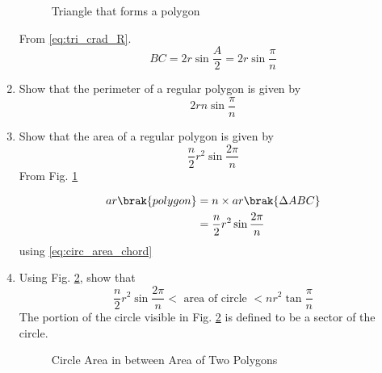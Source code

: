 \begin{enumerate}[label=\arabic*.,ref=\thesubsection.\theenumi]
\begin{figure}[!ht]
\begin{center}
		\resizebox{\columnwidth}{!}{}
	\end{center}
	\caption{Triangle that forms a polygon}
	\label{ch5_polygon_area}	
\end{figure}
%
\solution From  \eqref{eq:tri_crad_R}.
%
\begin{equation}
BC = 2r \sin \frac{A}{2} = 2r\sin\frac{\pi}{n}
\end{equation}
\item
Show that the perimeter of a regular polygon is given by 
%
\begin{equation}
\label{eq:peri_poly_n}
2rn \sin\frac{\pi}{n}
\end{equation}
%
\item
Show that the area of a regular polygon is given by 
%
\begin{equation}
\frac{n}{2}r^{2}\sin\frac{2\pi}{n}
\end{equation}
%
\solution  From Fig. 	\ref{ch5_polygon_area}	

%
\begin{equation}
\begin{split}
ar\brak{polygon} &= n \times ar\brak{\Delta ABC} \\
&= \frac{n}{2}r^{2}\sin\frac{2\pi}{n}
\end{split}
\end{equation}
%
using \eqref{eq:circ_area_chord}

\item
	Using Fig. \ref{fig:circ_poly_squeeze}, show that
%
\begin{equation}
\label{fig:circ_poly_squeeze_eq}
\frac{n}{2}r^{2}\sin\frac{2\pi}{n} < \text{ area of circle } < nr^{2}\tan\frac{\pi}{n}
\end{equation}
%
The portion of the circle visible in Fig. \ref{fig:circ_poly_squeeze} is defined to be a sector of the circle.

\begin{figure}[!ht]
	\begin{center}
		
		\resizebox{\columnwidth}{!}{}
	\end{center}
	\caption{Circle Area in between Area of Two Polygons}
	\label{fig:circ_poly_squeeze}	
\end{figure}
%


\end{enumerate}

